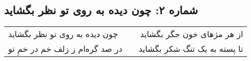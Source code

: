 \begin{center}
\section*{شماره ۲: چون دیده به روی تو نظر بگشاید}
\label{sec:002}
\begin{longtable}{l p{0.5cm} r}
چون دیده به روی تو نظر بگشاید
&&
از هر مژهای خون جگر بگشاید
\\
در صد گره‌ام ز زلف خم در خمِ تو
&&
تا پسته به یک تنگ شکر بگشاید
\\
\end{longtable}
\end{center}
